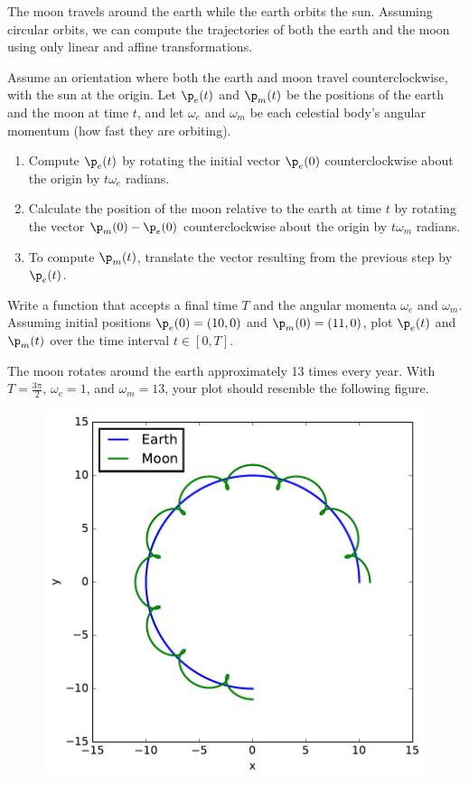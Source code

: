 \begin{problem}
The moon travels around the earth while the earth orbits the sun.
Assuming circular orbits, we can compute the trajectories of both the earth and the moon using only linear and affine transformations.

Assume an orientation where both the earth and moon travel counterclockwise, with the sun at the origin.
Let $\p_e(t)$ and $\p_m(t)$ be the positions of the earth and the moon at time $t$, and let $\omega_e$ and $\omega_m$ be each celestial body's angular momentum (how fast they are orbiting).

\begin{enumerate}
\item Compute $\p_e(t)$ by rotating the initial vector $\p_e(0)$ counterclockwise about the origin by $t\omega_e$ radians.
\item Calculate the position of the moon relative to the earth at time $t$ by rotating the vector $\p_m(0) - \p_e(0)$ counterclockwise about the origin by $t\omega_m$ radians.
\item To compute $\p_m(t)$, translate the vector resulting from the previous step by $\p_e(t)$.
\end{enumerate}

Write a function that accepts a final time $T$ and the angular momenta $\omega_e$ and $\omega_m$.
Assuming initial positions $\p_e(0) = (10,0)$ and $\p_m(0) = (11,0)$, plot $\p_e(t)$ and $\p_m(t)$ over the time interval $t \in [0, T]$.

The moon rotates around the earth approximately 13 times every year.
With $T = \frac{3\pi}{2}$, $\omega_e = 1$, and $\omega_m = 13$, your plot should resemble the following figure.
\\
\begin{figure}[H]
    \includegraphics[width=.7\textwidth]{figures/SolarSystem.pdf}
\end{figure}

\label{prob:solar-system-trajectories}
\end{problem}


